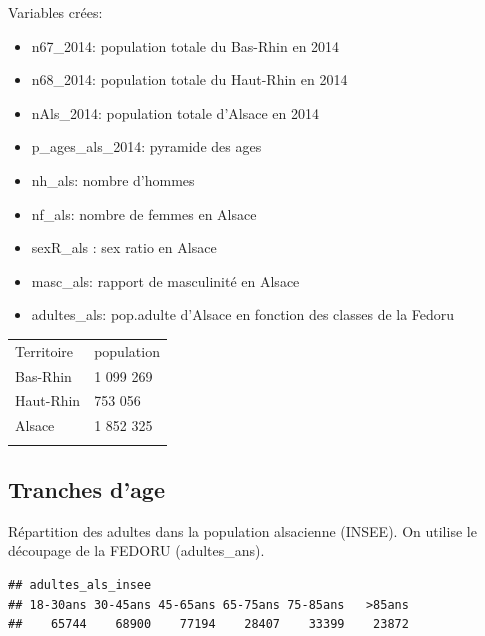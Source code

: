 \documentclass[]{article}
\newenvironment{Shaded}{\begin{snugshade}}{\end{snugshade}}
\newcommand{\KeywordTok}[1]{\textcolor[rgb]{0.13,0.29,0.53}{\textbf{{#1}}}}
\newcommand{\DataTypeTok}[1]{\textcolor[rgb]{0.13,0.29,0.53}{{#1}}}
\newcommand{\StringTok}[1]{\textcolor[rgb]{0.31,0.60,0.02}{{#1}}}
\newcommand{\OtherTok}[1]{\textcolor[rgb]{0.56,0.35,0.01}{{#1}}}
\newcommand{\NormalTok}[1]{{#1}}
\begin{document}
Variables crées:

\begin{itemize}
\itemsep1pt\parskip0pt
\item
  n67\_2014: population totale du Bas-Rhin en 2014
\item
  n68\_2014: population totale du Haut-Rhin en 2014
\item
  nAls\_2014: population totale d'Alsace en 2014
\item
  p\_ages\_als\_2014: pyramide des ages
\item
  nh\_als: nombre d'hommes
\item
  nf\_als: nombre de femmes en Alsace
\item
  sexR\_als : sex ratio en Alsace
\item
  masc\_als: rapport de masculinité en Alsace
\item
  adultes\_als: pop.adulte d'Alsace en fonction des classes de la Fedoru
\end{itemize}

\begin{longtable}[c]{@{}ll@{}}
\toprule\addlinespace
Territoire & population
\\\addlinespace
\midrule\endhead
Bas-Rhin & 1 099 269
\\\addlinespace
Haut-Rhin & 753 056
\\\addlinespace
Alsace & 1 852 325
\\\addlinespace
\bottomrule
\end{longtable}

\subsection{Tranches d'age}\label{tranches-dage}

Répartition des adultes dans la population alsacienne (INSEE). On
utilise le découpage de la FEDORU (adultes\_ans).

\begin{Shaded}
\end{Shaded}

\begin{verbatim}
## adultes_als_insee
## 18-30ans 30-45ans 45-65ans 65-75ans 75-85ans   >85ans 
##    65744    68900    77194    28407    33399    23872
\end{verbatim}
\end{document}
